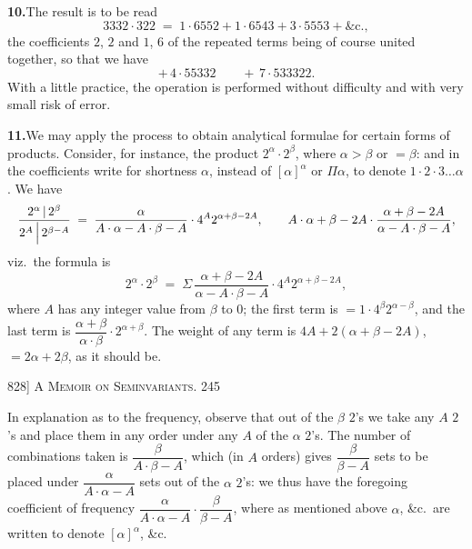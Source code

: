 \documentclass[11pt]{article}
\begin{document}
\medskip
\noindent\textbf{10.}\quad The result is to be read
\[
3332\cdot 322 \;=\; 1\cdot 6552 + 1\cdot 6543 + 3\cdot 5553 + \&\text{c.},
\]
the coefficients $2$, $2$ and $1$, $6$ of the repeated terms being of course united
together, so that we have
\[
+\,4\cdot 55332 \qquad +\,7\cdot 533322.
\]
With a little practice, the operation is performed without difficulty and with very
small risk of error.

\medskip
\noindent\textbf{11.}\quad We may apply the process to obtain analytical formulae for
certain forms of products. Consider, for instance, the product $2^{\alpha}\cdot 2^{\beta}$,
where $\alpha>\beta$ or $=\beta$: and in the coefficients write for shortness $\alpha$,
instead of $[\alpha]^{\alpha}$ or $\Pi\alpha$, to denote $1\cdot 2\cdot 3\ldots\alpha$.
We have
\[
\resizebox{\textwidth}{!}{$\displaystyle
\frac{2^{\alpha}\,|\,2^{\beta}}{2^{A}\,\Big|\,2^{\beta-A}} \;=\; \frac{\alpha}{A\cdot \alpha-A\cdot \beta-A}\cdot 4^{A}2^{\alpha+\beta-2A},\qquad A\cdot \alpha+\beta-2A\cdot \frac{\alpha+\beta-2A}{\alpha-A\cdot \beta-A},
$}
\]
viz.\ the formula is
\[
2^{\alpha}\cdot 2^{\beta} \;=\; \Sigma\,\frac{\alpha+\beta-2A}{\alpha-A\cdot \beta-A}\cdot 4^{A}2^{\alpha+\beta-2A},
\]
where $A$ has any integer value from $\beta$ to $0$; the first term is
$=1\cdot 4^{\beta}2^{\alpha-\beta}$, and the last term is $\dfrac{\alpha+\beta}{\alpha\cdot\beta}\cdot 2^{\alpha+\beta}$.
The weight of any term is $4A+2(\alpha+\beta-2A)$, $=2\alpha+2\beta$, as it should be.

\newpage
\noindent\textsc{828] \hfill A Memoir on Seminvariants. \hfill 245}
\vspace{0.6em}

\noindent In explanation as to the frequency, observe that out of the $\beta$ $2$'s we
take any $A$ $2$'s and place them in any order under any $A$ of the $\alpha$ $2$'s. The
number of combinations taken is $\dfrac{\beta}{A\cdot\beta-A}$, which (in $A$ orders)
gives $\dfrac{\beta}{\beta-A}$ sets to be placed under $\dfrac{\alpha}{A\cdot\alpha-A}$
sets out of the $\alpha$ $2$'s: we thus have the foregoing coefficient of frequency
$\dfrac{\alpha}{A\cdot\alpha-A}\cdot\dfrac{\beta}{\beta-A}$, where as mentioned above
$\alpha$, \&c.\ are written to denote $[\alpha]^{\alpha}$, \&c.
\end{document}
